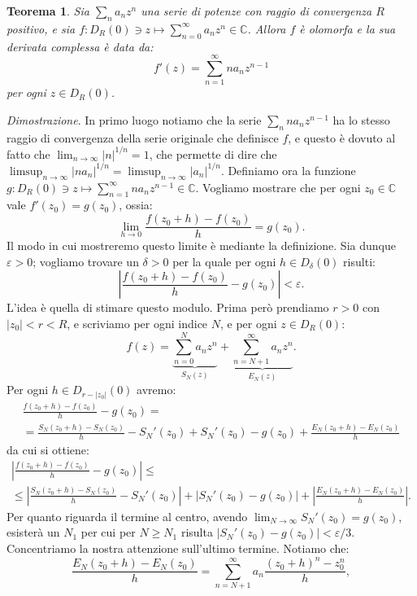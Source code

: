 \documentclass[11pt]{book}
\makeatletter
\theoremstyle{Definizione}
\theoremstyle{TeoremaProposizioneLemmaCorollarioCongettura}
\newtheorem{myteo}{Teorema}[section]
\theoremstyle{OsservazioneNotaEsempio}
\renewenvironment{proof}[1][\proofname]{\par
  \normalfont \topsep6\p@\@plus6\p@\relax
  \trivlist
  \item[\hskip\labelsep
        \itshape
    #1\@addpunct{.}]\ignorespaces
}{%
  \endtrivlist\@endpefalse
}
\renewenvironment{proof}{\textsl{Dimostrazione}.}{}
\newcommand{\C}{\mathbb{C}}
\newcommand{\Disc}[3][]{D^{#1}_{{#2}}({#3})}
\makeatother
\begin{document}
\begin{boxteo}{}
\begin{myteo}
Sia $\sum_n a_n z^n$ una serie di potenze con raggio di convergenza $R$ positivo, e sia $f: \Disc{R}{0} \ni z \longmapsto \sum_{n = 0}^\infty a_n z^n \in \C$. Allora $f$ è olomorfa e la sua derivata complessa è data da:
$$
f'(z) = \sum_{n = 1}^\infty n a_n z^{n-1}
$$
per ogni $z\in \Disc{R}{0}$.
\end{myteo}
\tcblower
\begin{proof}
In primo luogo notiamo che la serie $\sum_n n a_n z^{n-1}$ ha lo stesso raggio di convergenza della serie originale che definisce $f$, e questo è dovuto al fatto che $\lim_{n \to \infty} |n|^{1/n} = 1$, che permette di dire che $\limsup_{n \to \infty} |na_n|^{1/n} = \limsup_{n\to\infty} |a_n|^{1/n}$. Definiamo ora la funzione $g:\Disc{R}{0}\ni z \longmapsto \sum_{n = 1}^\infty n a_n z^{n-1}\in \C$. Vogliamo mostrare che per ogni $z_0\in \C$ vale $f'(z_0) = g(z_0)$, ossia:
$$
\lim_{h \to 0} \frac{f(z_0+h)-f(z_0)}{h} = g(z_0).
$$
Il modo in cui mostreremo questo limite è mediante la definizione. Sia dunque $\varepsilon>0$; vogliamo trovare un $\delta > 0$ per la quale per ogni $h\in \Disc{\delta}{0}$ risulti:
$$
\left|\frac{f(z_0+h)-f(z_0)}{h}-g(z_0)\right|< \varepsilon.
$$
L'idea è quella di stimare questo modulo. Prima però prendiamo $r > 0$ con $|z_0| < r < R$, e scriviamo per ogni indice $N$, e per ogni $z\in \Disc{R}{0}$:
$$
f(z) = \underbrace{\sum_{n = 0}^N a_n z^n}_{S_N(z)} + \underbrace{\sum_{n = N+1}^{\infty} a_n z^n}_{E_N(z)}.
$$
Per ogni $h\in \Disc{r-|z_0|}{0}$ avremo:
\begin{multline*}
\frac{f(z_0+h)-f(z_0)}{h}-g(z_0) =\\
= \frac{S_N(z_0+h)-S_N(z_0)}{h}-S_N'(z_0) + S_N'(z_0)-g(z_0) + \frac{E_N(z_0+h)-E_N(z_0)}{h}
\end{multline*}
da cui si ottiene:
\begin{multline}\label{eq:teo:TeoremaDerivataSerieDiPotenze}
\left|\frac{f(z_0+h)-f(z_0)}{h}-g(z_0)\right|\leq\\
\leq\left|\frac{S_N(z_0+h)-S_N(z_0)}{h}-S_N'(z_0)\right| + |S_N'(z_0)-g(z_0)| + \left|\frac{E_N(z_0+h)-E_N(z_0)}{h}\right|.
\end{multline}
Per quanto riguarda il termine al centro, avendo $\lim_{N \to \infty} S_N'(z_0) = g(z_0)$, esisterà un $N_1$ per cui per $N \geq N_1$ risulta $|S_N'(z_0)-g(z_0)| < \varepsilon/3$. Concentriamo la nostra attenzione sull'ultimo termine. Notiamo che:
$$
\frac{E_N(z_0+h)-E_N(z_0)}{h} = \sum_{n = N+1}^{\infty} a_n \frac{(z_0+h)^n-z_0^n}{h},
$$
\end{proof}
\end{boxteo}
\end{document}
